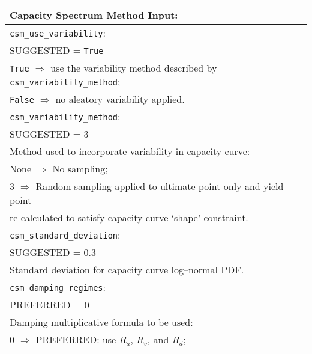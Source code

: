 \vspace{2em}
\begin{tabular}{|p{\textwidth}|}
\hline
\vspace{0.3em} \noindent \Large \textbf{Capacity Spectrum Method Input:} \normalsize \\
\hline \vspace{0.1em} \texttt{csm\_use\_variability}: \\
SUGGESTED = \texttt{True} \\
\hspace{0.5em} \texttt{True} $\Rightarrow$ use the variability method described by
\texttt{csm\_variability\_method};    \\
\hspace{0.5em} \texttt{False} $\Rightarrow$ no aleatory variability applied.  \\
\hline \vspace{0.1em} \texttt{csm\_variability\_method}: \\
SUGGESTED = 3 \\
Method used to incorporate variability in capacity curve\index{capacity curve}: \\
 \hspace{0.5em} None $\Rightarrow$ No sampling; \\
 \hspace{0.5em} 3 $\Rightarrow$ Random sampling applied to ultimate
 point only and yield point \\
 \hspace{2.5em} re-calculated to satisfy capacity curve `shape' constraint. \\
\hline \vspace{0.1em} \texttt{csm\_standard\_deviation}: \\
SUGGESTED = 0.3 \\
Standard deviation for capacity curve\index{capacity curve} log--normal PDF.      \\
\hline \vspace{0.1em} \texttt{csm\_damping\_regimes}: \\
PREFERRED = 0 \\
 Damping multiplicative formula to be
used: \\
 \hspace{0.5em} 0 $\Rightarrow$ \small{PREFERRED}: use $R_a$, $R_v$, and $R_d$; \\

\end{tabular}
